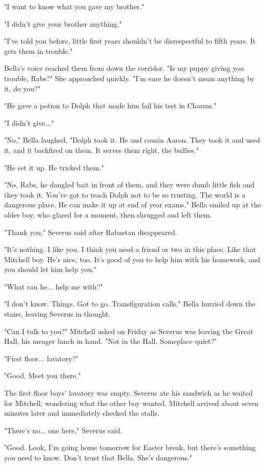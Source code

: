 \documentclass[a4paper,11pt]{article}
\begin{document}
"I want to know what you gave my brother."

"I didn't give your brother anything."

"I've told you before, little first years shouldn't be disrespectful to fifth years. It gets them in trouble."

Bella's voice reached them from down the corridor. "Is my puppy giving you trouble, Rabs?" She approached quickly. "I'm sure he doesn't mean anything by it, do you?"

"He gave a potion to Dolph that made him fail his test in Charms."

"I didn't give..."

"No," Bella laughed, "Dolph took it. He and cousin Aaron. They took it and used it, and it backfired on them. It serves them right, the bullies."

"He set it up. He tricked them."

"No, Rabs, he dangled bait in front of them, and they were dumb little fish and they took it. You've got to teach Dolph not to be so trusting. The world is a dangerous place. He can make it up at end of year exams." Bella smiled up at the older boy, who glared for a moment, then shrugged and left them.

"Thank you," Severus said after Rabastan disappeared.

"It's nothing. I like you. I think you need a friend or two in this place. Like that Mitchell boy. He's nice, too. It's good of you to help him with his homework, and you should let him help you."

"What can he... help me with?"

"I don't know. Things. Got to go. Transfiguration calls." Bella hurried down the stairs, leaving Severus in thought.

"Can I talk to you?" Mitchell asked on Friday as Severus was leaving the Great Hall, his meager lunch in hand. "Not in the Hall. Someplace quiet?"

"First floor... lavatory?"

"Good. Meet you there."

The first floor boys' lavatory was empty. Severus ate his sandwich as he waited for Mitchell, wondering what the other boy wanted. Mitchell arrived about seven minutes later and immediately checked the stalls.

"There's no... one here," Severus said.

"Good. Look, I'm going home tomorrow for Easter break, but there's something you need to know. Don't trust that Bella. She's dangerous."
\end{document}
